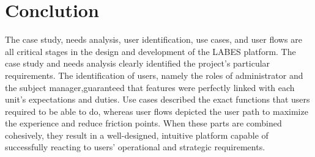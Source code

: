 \section{Conclution}
The case study, needs analysis, user identification, use cases, and user flows are all critical stages in the design and development of the LABES platform. The case study and needs analysis clearly identified the project's particular requirements. The identification of users, namely the roles of administrator and the subject manager,guaranteed that features were perfectly linked with each unit's expectations and duties. Use cases described the exact functions that users required to be able to do, whereas user flows depicted the user path to maximize the experience and reduce friction points. When these parts are combined cohesively, they result in a well-designed, intuitive platform capable of successfully reacting to users' operational and strategic requirements.
